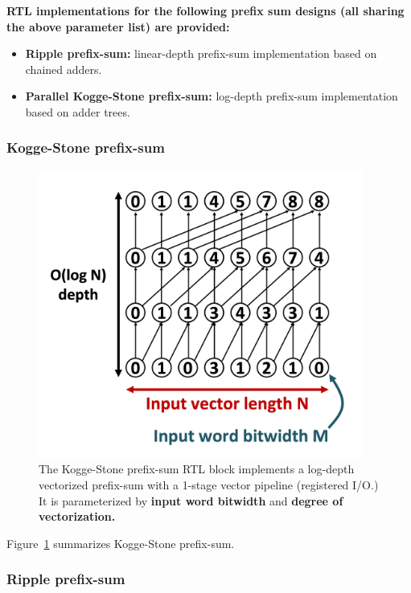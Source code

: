 \textbf{RTL implementations for the following prefix sum designs (all sharing the above parameter list) are provided:}

\begin{itemize}
    \item \textbf{Ripple prefix-sum:} linear-depth prefix-sum implementation based on chained adders.
    \item \textbf{Parallel Kogge-Stone\cite{koggestone} prefix-sum:} log-depth prefix-sum implementation based on adder trees.
\end{itemize}

\subsubsection{Kogge-Stone prefix-sum}

\begin{figure}[H]
    \centering
    \includegraphics[width=0.95\textwidth]{figures/kogge_stone_prefix_sum.png}
    \caption{The Kogge-Stone\cite{koggestone} prefix-sum RTL block implements a log-depth vectorized prefix-sum with a 1-stage vector pipeline (registered I/O.) It is parameterized by \textbf{input word bitwidth} and \textbf{degree of vectorization.}}
    \label{fig:kogge_stone_prefix_sum}
\end{figure}

Figure~\ref{fig:kogge_stone_prefix_sum} summarizes Kogge-Stone prefix-sum.

\subsubsection{Ripple prefix-sum}


